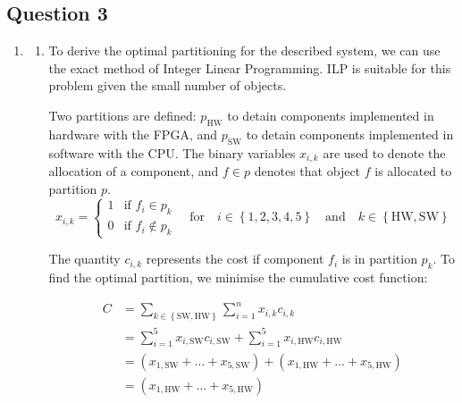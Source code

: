 \documentclass{article}
\numberwithin{equation}{section}
\numberwithin{table}{section}
\numberwithin{figure}{section}
\begin{document}
\subsection{Question 3}
\begin{enumerate}
    \item \begin{enumerate}
        \item To derive the optimal partitioning for the described system, we
            can use the exact method of Integer Linear Programming. ILP is
            suitable for this problem given the small number of objects.

            Two partitions are defined: $p_\text{HW}$ to detain components
            implemented in hardware with the FPGA, and $p_\text{SW}$ to detain
            components implemented in software with the CPU. The binary
            variables $x_{i,k}$ are used to denote the allocation of a
            component, and $f\in p$ denotes that object $f$ is allocated to
            partition $p$.
            \begin{equation}
                x_{i,k} = \begin{cases}
                    1 & \text{if $f_i \in p_k$} \\
                    0 & \text{if $f_i \not\in p_k$}
                \end{cases}
                \quad\text{for}\quad i\in\left\{ 1,2,3,4,5 \right\}
                \quad\text{and}\quad k\in\left\{ \text{HW},\text{SW} \right\}
            \end{equation}

            The quantity $c_{i,k}$ represents the cost if component $f_i$ is in
            partition $p_k$. To find the optimal partition, we minimise the
            cumulative cost function:

            \begin{align}
                C &= \sum_{k \in \left\{ \text{SW}, \text{HW} \right\}}
                    \sum_{i=1}^n x_{i,k} c_{i,k} \\
                &= \sum_{i=1}^5 x_{i,\text{SW}} c_{i,\text{SW}} +
                    \sum_{i=1}^5 x_{i,\text{HW}} c_{i,\text{HW}} \\
                &= \left( x_{1,\text{SW}} + \ldots + x_{5,\text{SW}} \right) +
                    \left( x_{1,\text{HW}} + \ldots + x_{5,\text{HW}} \right) \\
                &= \left( x_{1,\text{HW}} + \ldots + x_{5,\text{HW}} \right)
            \end{align}


\end{enumerate}
\end{enumerate}
\end{document}
